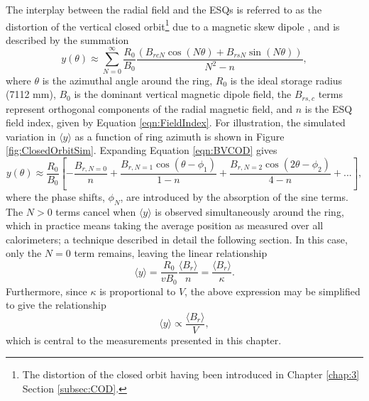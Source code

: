 The interplay between the radial field and the ESQs is referred to as the distortion of the vertical closed orbit\footnote{The distortion of the closed orbit having been introduced in Chapter \ref{chap:3} Section \ref{subsec:COD}.} due to a magnetic skew dipole \cite{BillNote2020}, and is described by the summation
%
\begin{equation} 
  y(\theta) \approx \sum_{N=0}^{\infty} \frac{R_{0}}{B_{0}} \frac{(B_{rcN}\cos(N\theta)+B_{rsN}\sin(N\theta))}{N^{2}-n},
  \label{eqn:BVCOD}
\end{equation}
%
where $\theta$ is the azimuthal angle around the ring, $R_{0}$ is the ideal storage radius (7112 mm), $B_{0}$ is the dominant vertical magnetic dipole field, the $B_{r s,c}$ terms represent orthogonal components of the radial magnetic field, and $n$ is the ESQ field index, given by Equation \ref{eqn:FieldIndex}. For illustration, the simulated variation in $\langle y \rangle$ as a function of ring azimuth is shown in Figure \ref{fig:ClosedOrbitSim}. Expanding Equation \ref{eqn:BVCOD} gives
%
\begin{equation} 
  y(\theta) \approx \frac{R_{0}}{B_{0}} \left[ -\frac{B_{r,N=0}}{n} + \frac{B_{r,N=1}\cos(\theta-\phi_{1})}{1-n} + \frac{B_{r,N=2}\cos(2\theta-\phi_{2})}{4-n} + ... \right],
  \label{eqn:BVCODExpansion}
\end{equation}
%
where the phase shifts, $\phi_{N}$, are introduced by the absorption of the sine terms. The $N>0$ terms cancel when $\langle y \rangle$ is observed simultaneously around the ring, which in practice means taking the average position as measured over all calorimeters; a technique described in detail the following section. In this case, only the $N=0$ term remains, leaving the linear relationship %
%
\begin{equation} 
  \langle y \rangle = \frac{R_{0}}{vB_{0}} \frac{\langle B_{r} \rangle}{n} = \frac{\langle B_{r} \rangle}{\kappa}.
  \label{eqn:ZerothOrder}
\end{equation}
%
Furthermore, since $\kappa$ is proportional to $V$, the above expression may be simplified to give the relationship 
%
\begin{equation} 
  \langle y \rangle \propto \frac{\langle B_{r} \rangle}{V}, 
  \label{eqn:ZerothOrderSimple}
\end{equation}
%
which is central to the measurements presented in this chapter.

